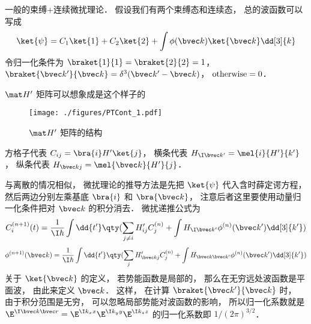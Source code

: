 


一般的束缚+连续微扰理论． 假设我们有两个束缚态和连续态， 总的波函数可以写成
 \begin{equation}
\ket{\psi} = C_1\ket{1} + C_2\ket{2} + \int \phi (\bvec k)\ket{\bvec k} \dd[3]{k}
\end{equation}
令归一化条件为 $\braket{1}{1} = \braket{2}{2} = 1$，  $\braket{\bvec k'}{\bvec k}  = \delta ^3 (\bvec k' - \bvec k)$，  $\rm{otherwise} = 0$． 

 $\mat H'$  矩阵可以想象成是这个样子的
\begin{figure}[ht]
\centering
\texttt{[image: ./figures/PTCont\_1.pdf]}
\caption{$\mat H'$ 矩阵的结构} 
\end{figure}

方格子代表 $C_{ij} = \bra{i} H' \ket{j}$， 横条代表 $H_{\I\bvec k'} = \mel{i}{H'}{k'}$，  纵条代表 $H_{\bvec k j} = \mel{\bvec k}{H'}{j}$． 

与离散的情况相似， 微扰理论的推导方法是先把 $\ket{\psi}$ 代入含时薛定谔方程， 然后两边分别左乘基底 $\bra{i}$ 和 $\bra{\bvec k}$，  注意后者这里要使用动量归一化条件把对 $\bvec k$ 的积分消去． 微扰递推公式为
 \begin{equation}
C_i^{(n + 1)}(t) = \frac{1}{\I\hbar} \int \dd{t'} \qty(\sum_{j \ne i} H'_{ij} C_j^{(n)} + \int H_{\I\bvec k'} \phi ^{(n)} (\bvec k') \dd[3]{k'} )
\end{equation}
\begin{equation}
\phi^{(n+1)}(\bvec k) = \frac{1}{\I\hbar} \int \dd{t'} \qty(\sum_j H'_{\bvec kj} C_j^{(n)} + \int H_{\bvec k\bvec k'} \phi ^{(n)}(\bvec k') \dd[3]{k'})
\end{equation}
关于 $\ket{\bvec k}$  的定义， 若势能函数是局部的， 那么在无穷远处波函数是平面波， 由此来定义 $\bvec k$．  这样， 在计算 $\braket{\bvec k'}{\bvec k}$ 时， 由于积分范围是无穷， 可以忽略局部势能对波函数的影响， 所以归一化系数就是 $\E^{\I \bvec k\bvec r} = \E^{\I k_x x} \E^{\I k_y y} \E^{\I k_z z}$ 的归一化系数即 $1/{(2\pi )^{3/2}}$． 
 
